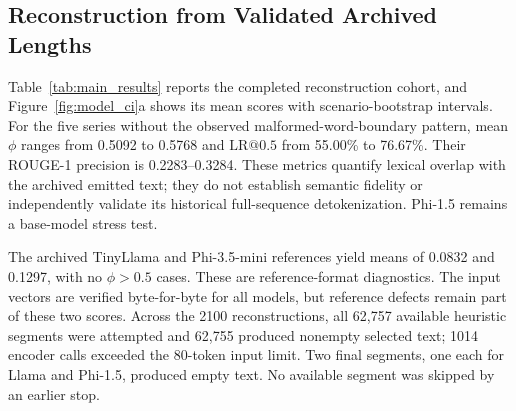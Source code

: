 \documentclass[electronics,article,submit,pdftex,moreauthors]{Definitions/mdpi}
\begin{document}
\subsection{Reconstruction from Validated Archived Lengths}
Table~\ref{tab:main_results} reports the completed reconstruction cohort, and Figure~\ref{fig:model_ci}a shows its mean scores with scenario-bootstrap intervals. For the five series without the observed malformed-word-boundary pattern, mean $\phi$ ranges from 0.5092 to 0.5768 and $\mathrm{LR}@0.5$ from 55.00\% to 76.67\%. Their ROUGE-1 precision is 0.2283--0.3284. These metrics quantify lexical overlap with the archived emitted text; they do not establish semantic fidelity or independently validate its historical full-sequence detokenization. Phi-1.5 remains a base-model stress test.

The archived TinyLlama and Phi-3.5-mini references yield means of 0.0832 and 0.1297, with no $\phi>0.5$ cases. These are reference-format diagnostics. The input vectors are verified byte-for-byte for all models, but reference defects remain part of these two scores. Across the 2100 reconstructions, all 62,757 available heuristic segments were attempted and 62,755 produced nonempty selected text; 1014 encoder calls exceeded the 80-token input limit. Two final segments, one each for Llama and Phi-1.5, produced empty text. No available segment was skipped by an earlier stop.
\end{document}
